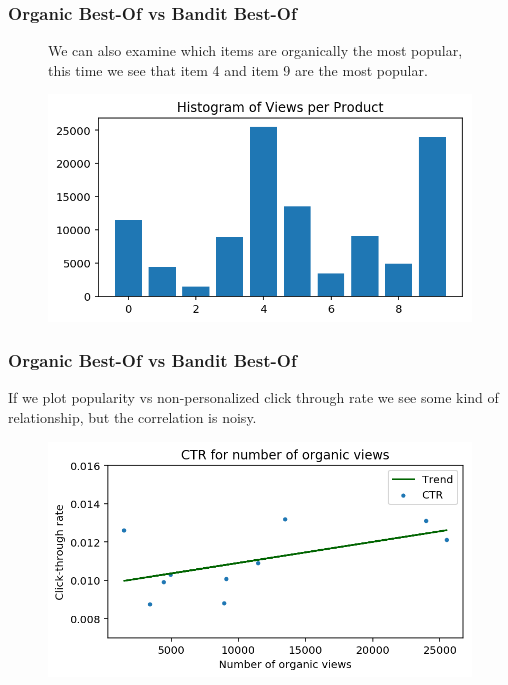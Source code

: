 \begin{frame}
\frametitle{Organic Best-Of vs Bandit Best-Of}


\begin{figure}[h!]

  We can also examine which items are organically the most popular, this time we see that item 4 and item 9 are the most popular.

  \includegraphics[scale=0.4]{images/organic_bestof2.png}
\centering
\label{motex1}
\end{figure}
\end{frame}

\begin{frame}
\frametitle{Organic Best-Of vs Bandit Best-Of}

If we plot popularity vs non-personalized click through rate we see some kind of relationship, but the correlation is noisy.


\begin{figure}[h!]
\includegraphics[scale=0.4]{images/organic_bestof3.png}
\centering
\label{motex1}
\end{figure}
\end{frame}

